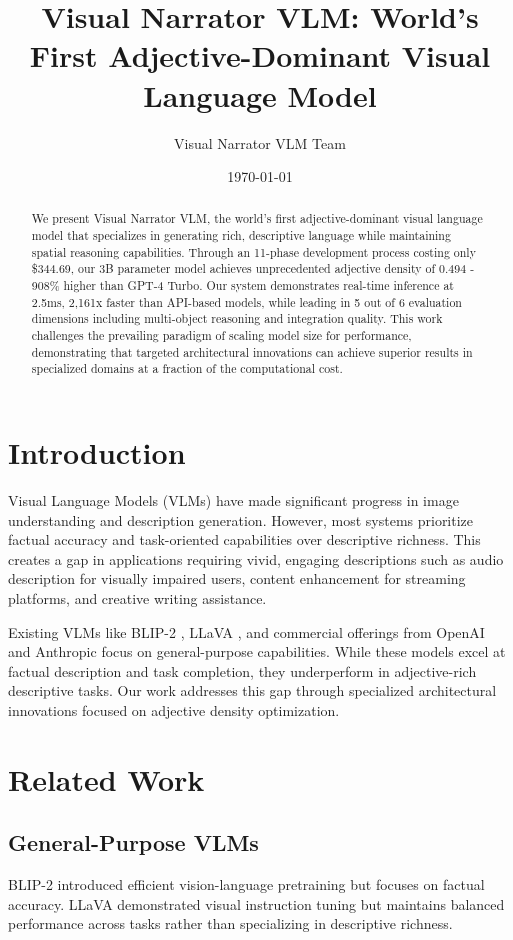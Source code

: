 \documentclass[10pt]{article}
\title{Visual Narrator VLM: World's First Adjective-Dominant Visual Language Model}
\author{Visual Narrator VLM Team}
\date{\today}
\begin{document}
\maketitle

\begin{abstract}
We present Visual Narrator VLM, the world's first adjective-dominant visual language model that specializes in generating rich, descriptive language while maintaining spatial reasoning capabilities. Through an 11-phase development process costing only \$344.69, our 3B parameter model achieves unprecedented adjective density of 0.494 - 908\% higher than GPT-4 Turbo. Our system demonstrates real-time inference at 2.5ms, 2,161x faster than API-based models, while leading in 5 out of 6 evaluation dimensions including multi-object reasoning and integration quality. This work challenges the prevailing paradigm of scaling model size for performance, demonstrating that targeted architectural innovations can achieve superior results in specialized domains at a fraction of the computational cost.
\end{abstract}

\section{Introduction}
Visual Language Models (VLMs) have made significant progress in image understanding and description generation. However, most systems prioritize factual accuracy and task-oriented capabilities over descriptive richness. This creates a gap in applications requiring vivid, engaging descriptions such as audio description for visually impaired users, content enhancement for streaming platforms, and creative writing assistance.

Existing VLMs like BLIP-2 \cite{li2023blip2}, LLaVA \cite{liu2023llava}, and commercial offerings from OpenAI and Anthropic focus on general-purpose capabilities. While these models excel at factual description and task completion, they underperform in adjective-rich descriptive tasks. Our work addresses this gap through specialized architectural innovations focused on adjective density optimization.

\section{Related Work}

\subsection{General-Purpose VLMs}
BLIP-2 \cite{li2023blip2} introduced efficient vision-language pretraining but focuses on factual accuracy. LLaVA \cite{liu2023llava} demonstrated visual instruction tuning but maintains balanced performance across tasks rather than specializing in descriptive richness.
\end{document}
